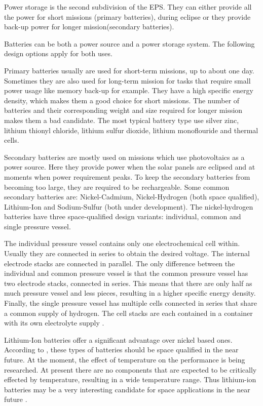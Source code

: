 Power storage is the second subdivision of the \ac{EPS}. They can either provide all the power for short missions (primary batteries), during eclipse or they provide back-up power for longer mission(secondary batteries).

Batteries can be both a power source and a power storage system. The following design options apply for both uses.

Primary batteries usually are used for short-term missions, up to about one day. Sometimes they are also used for long-term mission for tasks that require small power usage like memory back-up for example. They have a high specific energy density, which makes them a good choice for short missions. The number of batteries and their corresponding weight and size required for longer mission makes them a bad candidate. The most typical battery type use silver zinc, lithium thionyl chloride, lithium sulfur dioxide, lithium monoflouride and thermal cells.

Secondary batteries are mostly used on missions which use photovoltaics as a power source. Here they provide power when the solar panels are eclipsed and at moments when power requirement peaks. To keep the secondary batteries from becoming too large, they are required to be rechargeable. Some common secondary batteries are: Nickel-Cadmium, Nickel-Hydrogen (both space qualified), Lithium-Ion and Sodium-Sulfur (both under development). The nickel-hydrogen batteries have three space-qualified design variants: individual, common and single pressure vessel.

The individual pressure vessel contains only one electrochemical cell within. Usually they are connected in series to obtain the desired voltage.
The internal electrode stacks are connected in parallel.
The only difference between the individual and common pressure vessel is that the common pressure vessel has two electrode stacks, connected in series. This means that there are only half as much pressure vessel and less pieces, resulting in a higher specific energy density. 
Finally, the single pressure vessel has multiple cells connected in series that share a common supply of hydrogen. The cell stacks are each contained in a container with its own electrolyte supply \cite{larson}. 

Lithium-Ion batteries offer a significant advantage over nickel based ones. According to \cite{larson}, these types of batteries should be space qualified in the near future. At the moment, the effect of temperature on the performance is being researched. At present there are no components that are expected to be critically effected by temperature, resulting in a wide temperature range. Thus lithium-ion batteries may be a very interesting candidate for space applications in the near future \cite{lithium1}.

